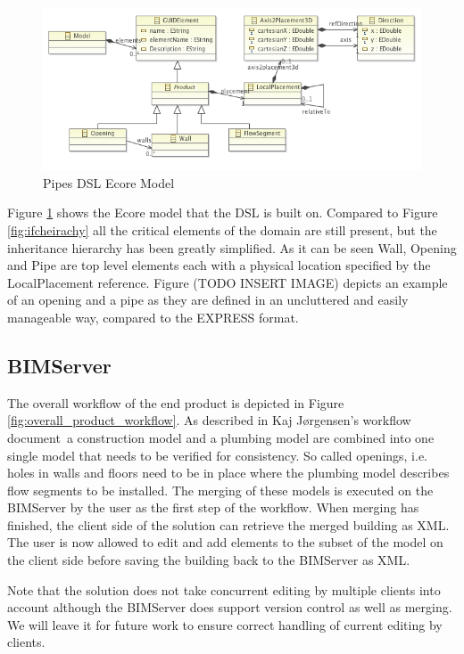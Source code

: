 \begin{figure}[t]
    \centering
        \includegraphics[width=120mm]{images/PipesEcoreModel.png}
    \caption{Pipes DSL Ecore Model}
    \label{fig:pipes_dsl_ecore_model}
\end{figure}

Figure \ref{fig:pipes_dsl_ecore_model} shows the Ecore model that the DSL is built on. Compared to Figure \ref{fig:ifcheirachy} all the critical elements of the domain are still present, but the inheritance hierarchy has been greatly simplified. As it can be seen Wall, Opening and Pipe are top level elements each with a physical location specified by the LocalPlacement reference. Figure (TODO INSERT IMAGE) depicts an example of an opening and a pipe as they are defined in an uncluttered and easily manageable way, compared to the EXPRESS format.

\subsection{BIMServer}
The overall workflow of the end product is depicted in Figure \ref{fig:overall_product_workflow}. As described in Kaj Jørgensen's workflow document\,\cite{jorgensen12} a construction model and a plumbing model are combined into one single model that needs to be verified for consistency. So called openings, i.e. holes in walls and floors need to be in place where the plumbing model describes flow segments to be installed. The merging of these models is executed on the BIMServer by the user as the first step of the workflow. When merging has finished, the client side of the solution can retrieve the merged building as XML. The user is now allowed to edit and add elements to the subset of the model on the client side before saving the building back to the BIMServer as XML.

Note that the solution does not take concurrent editing by multiple clients into account although the BIMServer does support version control as well as merging. We will leave it for future work to ensure correct handling of current editing by clients.

